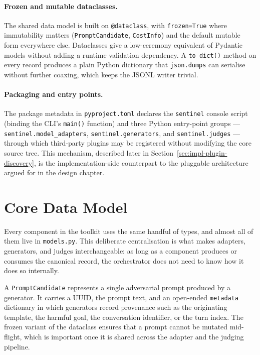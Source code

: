 \paragraph{Frozen and mutable dataclasses.}
The shared data model is built on \texttt{@dataclass}, with \texttt{frozen=True} where immutability matters (\texttt{PromptCandidate}, \texttt{CostInfo}) and the default mutable form everywhere else.
Dataclasses give a low-ceremony equivalent of Pydantic models without adding a runtime validation dependency.
A \texttt{to\_dict()} method on every record produces a plain Python dictionary that \texttt{json.dumps} can serialise without further coaxing, which keeps the JSONL writer trivial.

\paragraph{Packaging and entry points.}
The package metadata in \texttt{pyproject.toml} declares the \texttt{sentinel} console script (binding the CLI's \texttt{main()} function) and three Python entry-point groups --- \texttt{sentinel.model\_adapters}, \texttt{sentinel.generators}, and \texttt{sentinel.judges} --- through which third-party plugins may be registered without modifying the core source tree.
This mechanism, described later in Section~\ref{sec:impl-plugin-discovery}, is the implementation-side counterpart to the pluggable architecture argued for in the design chapter.

\section{Core Data Model}\label{sec:impl-data-model}

Every component in the toolkit uses the same handful of types, and almost all of them live in \texttt{models.py}.
This deliberate centralisation is what makes adapters, generators, and judges interchangeable: as long as a component produces or consumes the canonical record, the orchestrator does not need to know how it does so internally.

A \texttt{PromptCandidate} represents a single adversarial prompt produced by a generator.
It carries a UUID, the prompt text, and an open-ended \texttt{metadata} dictionary in which generators record provenance such as the originating template, the harmful goal, the conversation identifier, or the turn index.
The frozen variant of the dataclass ensures that a prompt cannot be mutated mid-flight, which is important once it is shared across the adapter and the judging pipeline.

